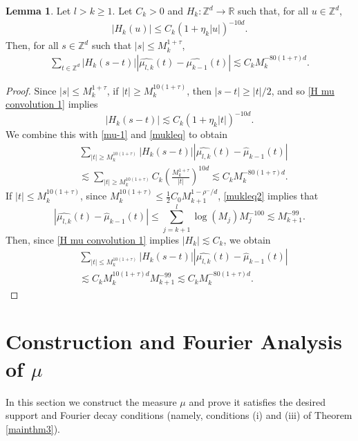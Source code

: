 \documentclass{amsart}
\numberwithin{equation}{section}
\theoremstyle{definition}
\newtheorem{lemma}[theorem]{Lemma}
\theoremstyle{definition}
\def\RR{\mathbb{R}}
\def\ZZ{\mathbb{Z}}
\begin{document}
\begin{lemma}\label{H mu convolution lemma}
Let $l > k \geq 1$.  
Let $C_k > 0$ and $H_k:\ZZ^d \to \RR$ such that, for all $u \in \ZZ^d$, 
\begin{align}\label{H mu convolution 1}
|H_k(u)| \leq C_k (1+\eta_k|u|)^{-10d}. 
\end{align}
Then, for all $s \in \ZZ^d$ such that $|s| \leq M_k^{1+\tau}$, 
\begin{align*}
\sum_{t \in \ZZ^d} |H_k(s-t)| 
| \widehat{\mu_{l,k}} (t) - \widehat{\mu_{k-1}}(t) |
\lesssim C_k M_{k}^{-80(1+\tau)d}. 
\end{align*}
\end{lemma}
\begin{proof}
Since $|s| \leq M_{k}^{1+\tau}$, 
if $|t| \geq M_k^{10(1+\tau)}$, then 
$|s-t| \geq |t|/2$, and so \eqref{H mu convolution 1} implies 
$$
|H_k(s-t)| \lesssim C_k (1+\eta_k |t|)^{-10d}. 
$$
We combine this with \eqref{mu-1} and \eqref{mukleq} to obtain 
\begin{align*}
&\sum_{|t| \geq M_k^{10(1+\tau)}} 
|H_k(s-t)| |\widehat{\mu_{l,k}} (t) - \widehat{\mu}_{k-1}(t)| 
\\
&
\lesssim \sum_{|t| \geq M_k^{10(1+\tau)}} C_k  \left( \frac{M_k^{1+\tau}}{|t|} \right)^{10d} 
\lesssim C_k M_k^{-80(1+\tau)d}.
\end{align*}
If $|t| \leq M_k^{10(1+\tau)}$,
since $M_{k}^{10(1+\tau)} \leq %
\frac{1}{2}C_0 M_{k+1}^{1-\rho^{-}/d}$, 
\eqref{mukleq2} implies that
$$
|\widehat{\mu_{l,k}} (t) - \widehat{\mu}_{k-1}(t)| \leq \sum_{j=k+1}^l \log(M_j) M_j^{-100} \lesssim M_{k+1}^{-99}.
$$
Then, since \eqref{H mu convolution 1} implies $|H_k| \lesssim C_k$, 
we obtain
\begin{align*}
&\sum_{|t| \leq M_k^{10(1+\tau)}}  |H_k (s-t)| |\widehat{\mu_{l,k}} (t) - \widehat{\mu}_{k-1}(t)| \\
&\lesssim C_k M_k^{10(1+\tau) d} M_{k+1}^{-99} \lesssim C_k M_k^{-80(1+\tau)d}.
\end{align*}
\end{proof}



\section{Construction and Fourier Analysis of  \texorpdfstring{$\mu$}{mu}}\label{sec_measure}


In this section we construct the measure $\mu$ and prove it satisfies 
the desired support and Fourier decay conditions (namely, conditions (i) and (iii) of Theorem \ref{mainthm3}). 
\end{document}
